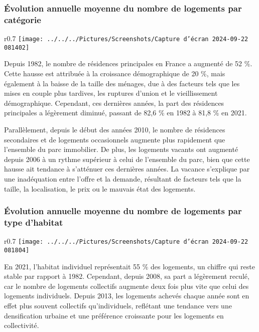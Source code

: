 \documentclass[a4paper, 12pt]{report}
\begin{document}
\subsubsection{Évolution annuelle moyenne du nombre de logements par catégorie}
\newpage
\begin{wrapfigure}{r}{0.7\textwidth}
	\centering
\texttt{[image: ../../../Pictures/Screenshots/Capture d'écran 2024-09-22 081402]}
\end{wrapfigure}

Depuis 1982, le nombre de résidences principales en France a augmenté de 52 \%. Cette hausse est attribuée à la croissance démographique de 20 \%, mais également à la baisse de la taille des ménages, due à des facteurs tels que les mises en couple plus tardives, les ruptures d’union et le vieillissement démographique. Cependant, ces dernières années, la part des résidences principales a légèrement diminué, passant de 82,6 \% en 1982 à 81,8 \% en 2021. 

Parallèlement, depuis le début des années 2010, le nombre de résidences secondaires et de logements occasionnels augmente plus rapidement que l’ensemble du parc immobilier. De plus, les logements vacants ont augmenté depuis 2006 à un rythme supérieur à celui de l’ensemble du parc, bien que cette hausse ait tendance à s’atténuer ces dernières années. La vacance s’explique par une inadéquation entre l’offre et la demande, résultant de facteurs tels que la taille, la localisation, le prix ou le mauvais état des logements.

\subsubsection{Évolution annuelle moyenne du nombre de logements par type d'habitat}

\begin{wrapfigure}{r}{0.7\textwidth}
	\centering
\texttt{[image: ../../../Pictures/Screenshots/Capture d'écran 2024-09-22 081804]}
\end{wrapfigure}

En 2021, l’habitat individuel représentait 55 \% des logements, un chiffre qui reste stable par rapport à 1982. Cependant, depuis 2008, sa part a légèrement reculé, car le nombre de logements collectifs augmente deux fois plus vite que celui des logements individuels. Depuis 2013, les logements achevés chaque année sont en effet plus souvent collectifs qu’individuels, reflétant une tendance vers une densification urbaine et une préférence croissante pour les logements en collectivité.
\end{document}
